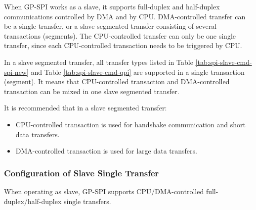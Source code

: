 \documentclass[main\_\_EN.tex]{subfiles}
\begin{document}
When GP-SPI works as a slave, it supports full-duplex and half-duplex communications controlled by DMA and by CPU. DMA-controlled transfer can be a single transfer, or a slave segmented transfer consisting of several transactions (segments). The CPU-controlled transfer can only be one single transfer, since each CPU-controlled transaction needs to be triggered by CPU.

In a slave segmented transfer, all transfer types listed in Table \ref{tab:spi-slave-cmd-spi-new} and Table \ref{tab:spi-slave-cmd-qpi} are supported in a single transaction (segment). It means that CPU-controlled transaction and DMA-controlled transaction can be mixed in one slave segmented transfer.

It is recommended that in a slave segmented transfer:

\begin{itemize}
    \item CPU-controlled transaction is used for handshake communication and short data transfers.

    \item DMA-controlled transaction is used for large data transfers.
\end{itemize}


\subsubsection{Configuration of Slave Single Transfer}\label{GP-SPI2 slave single transfer}

When operating as slave, GP-SPI supports CPU/DMA-controlled full-duplex/half-duplex single transfers.
\end{document}
